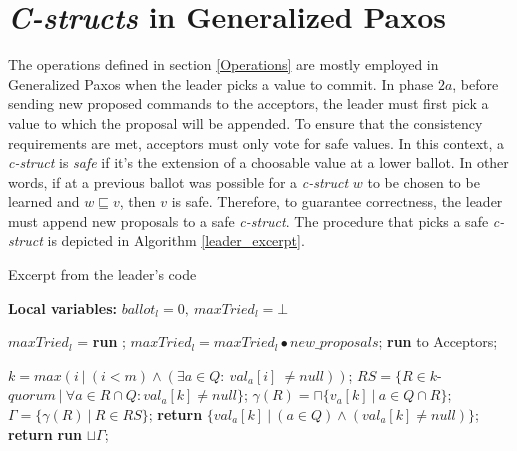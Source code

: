 \section{\textit{C-structs} in Generalized Paxos}
The operations defined in section \ref{Operations} are mostly employed in Generalized Paxos when the leader picks a value to commit. In phase $2a$, before sending new proposed commands to the acceptors, the leader must first pick a value to which the proposal will be appended. To ensure that the consistency requirements are met, acceptors must only vote for safe values. In this context, a \textit{c-struct} is \textit{safe} if it's the extension of a choosable value at a lower ballot. In other words, if at a previous ballot was possible for a \textit{c-struct} $w$ to be chosen to be learned and $w \sqsubseteq v$, then $v$ is safe. Therefore, to guarantee correctness, the leader must append new proposals to a safe \textit{c-struct}. The procedure that picks a safe \textit{c-struct} is depicted in Algorithm \ref{leader_excerpt}.\par
\begin{algorithm}
	\caption{Excerpt from the leader's code}
	\label{leader_excerpt}
	\textbf{Local variables:} $ballot_l = 0,\ maxTried_l = \bot$
	\begin{algorithmic}[1]
		\State $maxTried_l$ = \textbf{run} ;
		\State $maxTried_l = maxTried_l \bullet new\_proposals$;
		\State \textbf{run}  to Acceptors;
		\EndFunction
		
		\State
		\State $k = max(i\ |\ (i < m) \wedge (\exists a \in Q :\ val_a[i]\ \neq null))$;
		\State $RS = \{R \in k$-$quorum\ |\ \forall a \in R \cap Q : val_a[k] \neq null\}$;
		\State $\gamma(R) = \sqcap \{v_a[k]\ |\ a \in Q \cap R \}$;
		\State $\Gamma = \{\gamma(R)\ |\ R \in RS \}$;
		\State
		\State \textbf{return} $\{val_a[k]\ |\ (a \in Q) \wedge (val_a[k] \neq null)\}$;
		\Else
		\State \textbf{return} \textbf{run} $\sqcup \Gamma$;
		\EndIf
		\EndFunction
		
	\end{algorithmic}
\end{algorithm}

